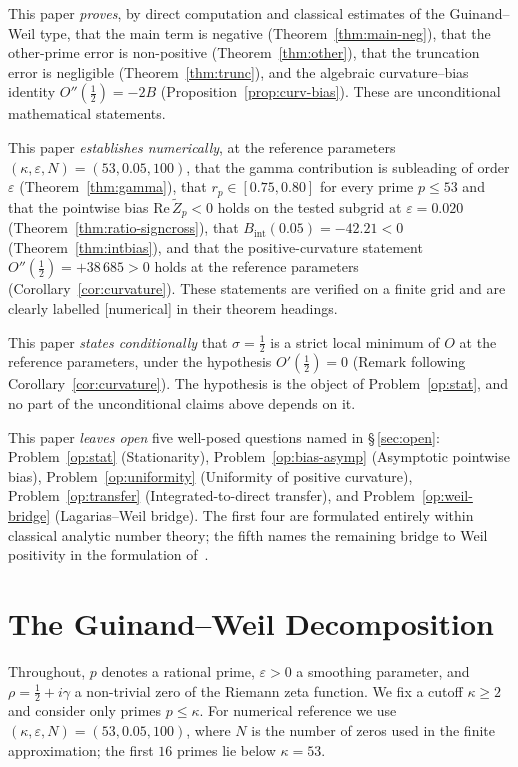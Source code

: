 \documentclass[11pt]{article}
\newcommand{\Zt}{\widetilde{Z}}
\begin{document}
This paper \emph{proves}, by direct computation and classical estimates
of the Guinand--Weil type, that the main term is negative
(Theorem~\ref{thm:main-neg}), that the other-prime error is
non-positive (Theorem~\ref{thm:other}), that the truncation error is
negligible (Theorem~\ref{thm:trunc}), and the algebraic
curvature--bias identity $O''(\tfrac12)=-2B$
(Proposition~\ref{prop:curv-bias}).
These are unconditional mathematical statements.

This paper \emph{establishes numerically}, at the reference parameters
$(\kappa,\varepsilon,N)=(53,0.05,100)$, that the gamma contribution is
subleading of order $\varepsilon$ (Theorem~\ref{thm:gamma}), that
$r_p\in[0.75,0.80]$ for every prime $p\le 53$ and that the pointwise
bias $\mathrm{Re}\,\Zt_p<0$ holds on the tested subgrid at
$\varepsilon=0.020$ (Theorem~\ref{thm:ratio-signcross}), that
$B_{\mathrm{int}}(0.05)=-42.21<0$ (Theorem~\ref{thm:intbias}), and that
the positive-curvature statement $O''(\tfrac12)=+38\,685>0$ holds at
the reference parameters (Corollary~\ref{cor:curvature}).
These statements are verified on a finite grid and are clearly labelled
[numerical] in their theorem headings.

This paper \emph{states conditionally} that $\sigma=\tfrac12$ is a
strict local minimum of $O$ at the reference parameters, under the
hypothesis $O'(\tfrac12)=0$ (Remark following
Corollary~\ref{cor:curvature}).
The hypothesis is the object of Problem~\ref{op:stat}, and no part of
the unconditional claims above depends on it.

This paper \emph{leaves open} five well-posed questions named in
\S\,\ref{sec:open}: Problem~\ref{op:stat} (Stationarity),
Problem~\ref{op:bias-asymp} (Asymptotic pointwise bias),
Problem~\ref{op:uniformity} (Uniformity of positive curvature),
Problem~\ref{op:transfer} (Integrated-to-direct transfer), and
Problem~\ref{op:weil-bridge} (Lagarias--Weil bridge).
The first four are formulated entirely within classical analytic number
theory; the fifth names the remaining bridge to Weil positivity in
the formulation of~\cite{Lagarias}.

\section{The Guinand--Weil Decomposition}
\label{sec:gw}

Throughout, $p$ denotes a rational prime, $\varepsilon>0$ a smoothing
parameter, and $\rho=\tfrac12+i\gamma$ a non-trivial zero of the
Riemann zeta function.
We fix a cutoff $\kappa\ge 2$ and consider only primes $p\le\kappa$.
For numerical reference we use $(\kappa,\varepsilon,N)=(53,0.05,100)$,
where $N$ is the number of zeros used in the finite approximation;
the first $16$ primes lie below $\kappa=53$.
\end{document}

